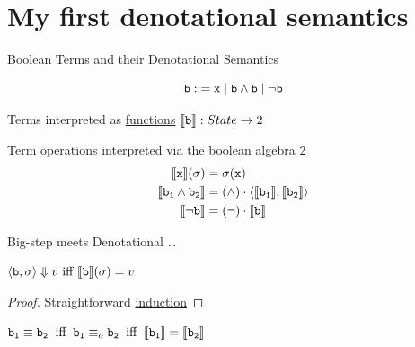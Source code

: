 \documentclass{beamer}
\begin{document}
\section{My first denotational semantics}

\begin{frame}{Boolean Terms and their Denotational Semantics}

        \begin{block}{\vspace*{-3.5ex}}
        \[
                \mathtt{b} ::= \mathtt{x} \mid \mathtt{b} \wedge \mathtt{b} \mid \neg \mathtt{b}
        \]
        \end{block} 

        \bigskip
        Terms interpreted as \alert{\underline{functions}}
        $\llbracket \mathtt{b} \rrbracket : State \to 2$

        Term operations interpreted via the \alert{\underline{boolean algebra}} $2$ 
        \bigskip
        \begin{align*}
                \llbracket \mathtt{x} \rrbracket(\sigma) & = \sigma (\mathtt{x}) \\
                \llbracket \mathtt{b_1} \wedge \mathtt{b_2} \rrbracket & 
                = (\wedge) \cdot \langle \llbracket \mathtt{b_1} \rrbracket, \llbracket \mathtt{b_2} \rrbracket \rangle \\
                \llbracket \neg \mathtt{b} \rrbracket & = (\neg) \cdot \llbracket \mathtt{b} \rrbracket
        \end{align*}
\end{frame}

\begin{frame}{Big-step meets Denotational \dots }

        \begin{theorem}
                $\langle \mathtt{b}, \sigma \rangle \Downarrow v \text{ iff }
                \llbracket \mathtt{b} \rrbracket(\sigma) = v$
        \end{theorem}

        \begin{proof}
                Straightforward \alert{\underline{induction}}
        \end{proof}

        \bigskip
        \bigskip
        \begin{corollary}
                $\mathtt{b_1} \equiv \mathtt{b_2} \> \text{ iff } \>
                \mathtt{b_1} \equiv_o \mathtt{b_2} \> \text{ iff } \>
                \llbracket \mathtt{b_1} \rrbracket = \llbracket \mathtt{b_2} \rrbracket$
        \end{corollary}
\end{frame}
\end{document}
